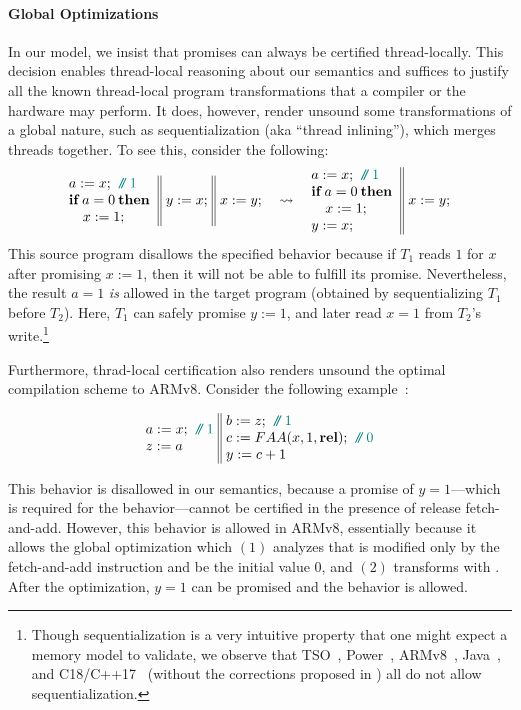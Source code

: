 \paragraph{Global Optimizations}
In our model, we insist that promises can always be certified thread-locally. 
This decision enables thread-local reasoning about our semantics and suffices
to justify all the known thread-local program transformations that a compiler
or the hardware may perform.  It does, however, render unsound some transformations of a global nature,
such as sequentialization (aka ``thread inlining''), which merges threads together.
To see this, consider the following:
$$\inarrIIId{
a:=x; \comment{1} \\
\itne{a=0}{}\\
\quad x:=1;
}{
y:=x;
}{
x:=y;
}\quad
\leadsto
\quad
\inarrIId{
a:=x; \comment{1} \\
\itne{a=0}{}\\
\quad x:=1; \\
y:=x;
}{
x:=y;
}
$$
This source program disallows the specified behavior because if $T_1$ reads $1$ for $x$ after promising $x:=1$, then
it will not be able to fulfill its promise.
Nevertheless, the result $a=1$ \emph{is} allowed in the target program 
(obtained by sequentializing $T_1$ before $T_2$).
Here, $T_1$ can safely promise $y:=1$, and later read $x=1$ from $T_2$'s 
write.\footnote{Though sequentialization is a very intuitive property that one might expect a memory
model to validate,
we observe that TSO~\cite{x86-tso}, Power~\cite{herding-cats}, ARMv8~\cite{arm8-model}, Java~\cite{jmm}, 
and C18/C++17~\cite{Batty:2011} (without the corrections proposed in \cite{c11comp})
all do not allow sequentialization.
}

Furthermore, thrad-local certification also renders unsound the optimal compilation scheme to ARMv8.
Consider the following example~\cite[Example 3.10]{imm-compilation}:

$$\inarrIId{
a:=x; \comment{1} \\
z:=a
}{
b:=z; \comment{1} \\
c:=FAA(x,1,\relw); \comment{0} \\
y:=c+1
}
$$

\noindent This behavior is disallowed in our semantics, because a promise of $y = 1$---which is
required for the behavior---cannot be certified in the presence of release fetch-and-add.  However,
this behavior is allowed in ARMv8, essentially because it allows the global optimization which $(1)$
analyzes that  is modified only by the fetch-and-add instruction and  be the initial
value $0$, and $(2)$ transforms  with .  After the optimization, $y=1$ can
be promised and the behavior is allowed.

